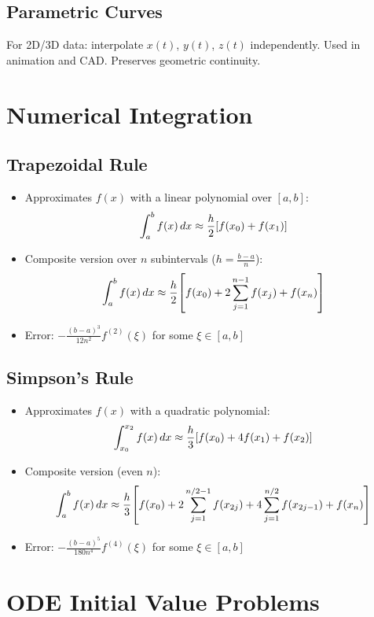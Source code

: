 \documentclass[9pt, letterpaper]{extarticle}
\begin{document}
\begin{multicols*}{3}
  \subsection{Parametric Curves}
  For 2D/3D data: interpolate $x(t)$, $y(t)$, $z(t)$ independently.
  Used in animation and CAD. Preserves geometric continuity.

  \section{Numerical Integration}

  \subsection{Trapezoidal Rule}
  \begin{itemize}
    \item Approximates $f(x)$ with a linear polynomial over $[a,b]$:
      \[
        \int_a^b f(x)\,dx \approx \frac{h}{2} \qty[f(x_0) + f(x_1)]
      \]
    \item Composite version over $n$ subintervals ($h = \frac{b-a}{n}$):
      \[
        \int_a^b f(x)\,dx \approx \frac{h}{2} \qty[f(x_0) + 2 \sum_{j=1}^{n-1} f(x_j) + f(x_n)]
      \]
    \item Error: $-\frac{(b-a)^3}{12n^2}f^{(2)}(\xi)$ for some $\xi \in [a,b]$
  \end{itemize}

  \subsection{Simpson's Rule}
  \begin{itemize}
    \item Approximates $f(x)$ with a quadratic polynomial:
      \[
        \int_{x_0}^{x_2} f(x)\,dx \approx \frac{h}{3} \qty[f(x_0) + 4f(x_1) + f(x_2)]
      \]
    \item Composite version (even $n$):
      \[
        \int_a^b f(x)\,dx \approx \frac{h}{3} \qty[
        f(x_0) +
        2\sum_{j=1}^{n/2 - 1} f(x_{2j}) +
        4\sum_{j=1}^{n/2} f(x_{2j - 1}) +
        f(x_n)
        ]
      \]
    \item Error: $-\frac{(b-a)^5}{180n^4}f^{(4)}(\xi)$ for some $\xi \in [a,b]$
  \end{itemize}

  \section{ODE Initial Value Problems}


\end{multicols*}
\end{document}
